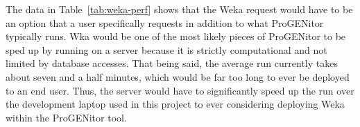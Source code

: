 The data in Table~\ref{tab:weka-perf} shows that the Weka request would have to be an option
that a user specifically requests in addition to what ProGENitor typically runs.
Wka would be one of the most likely pieces of ProGENitor to be sped up by
running on a server because it is strictly computational and not limited by
database accesses.  That being said, the average run currently takes about seven
and a half minutes, which would be far too long to ever be deployed to an end
user.  Thus, the server would have to significantly speed up the run over the
development laptop used in this project to ever considering deploying Weka
within the ProGENitor tool.
